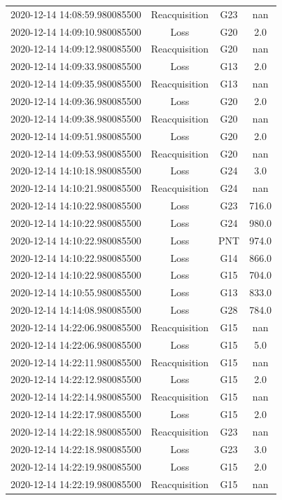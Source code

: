 \begin{enumerate}
\begin{longtabu}{cccc}
2020{-}12{-}14 14:08:59.980085500&Reacquisition&G23&nan\\%
2020{-}12{-}14 14:09:10.980085500&Loss&G20&2.0\\%
2020{-}12{-}14 14:09:12.980085500&Reacquisition&G20&nan\\%
2020{-}12{-}14 14:09:33.980085500&Loss&G13&2.0\\%
2020{-}12{-}14 14:09:35.980085500&Reacquisition&G13&nan\\%
2020{-}12{-}14 14:09:36.980085500&Loss&G20&2.0\\%
2020{-}12{-}14 14:09:38.980085500&Reacquisition&G20&nan\\%
2020{-}12{-}14 14:09:51.980085500&Loss&G20&2.0\\%
2020{-}12{-}14 14:09:53.980085500&Reacquisition&G20&nan\\%
2020{-}12{-}14 14:10:18.980085500&Loss&G24&3.0\\%
2020{-}12{-}14 14:10:21.980085500&Reacquisition&G24&nan\\%
2020{-}12{-}14 14:10:22.980085500&Loss&G23&716.0\\%
2020{-}12{-}14 14:10:22.980085500&Loss&G24&980.0\\%
2020{-}12{-}14 14:10:22.980085500&Loss&PNT&974.0\\%
2020{-}12{-}14 14:10:22.980085500&Loss&G14&866.0\\%
2020{-}12{-}14 14:10:22.980085500&Loss&G15&704.0\\%
2020{-}12{-}14 14:10:55.980085500&Loss&G13&833.0\\%
2020{-}12{-}14 14:14:08.980085500&Loss&G28&784.0\\%
2020{-}12{-}14 14:22:06.980085500&Reacquisition&G15&nan\\%
2020{-}12{-}14 14:22:06.980085500&Loss&G15&5.0\\%
2020{-}12{-}14 14:22:11.980085500&Reacquisition&G15&nan\\%
2020{-}12{-}14 14:22:12.980085500&Loss&G15&2.0\\%
2020{-}12{-}14 14:22:14.980085500&Reacquisition&G15&nan\\%
2020{-}12{-}14 14:22:17.980085500&Loss&G15&2.0\\%
2020{-}12{-}14 14:22:18.980085500&Reacquisition&G23&nan\\%
2020{-}12{-}14 14:22:18.980085500&Loss&G23&3.0\\%
2020{-}12{-}14 14:22:19.980085500&Loss&G15&2.0\\%
2020{-}12{-}14 14:22:19.980085500&Reacquisition&G15&nan\\%

\end{longtabu}
\end{enumerate}
